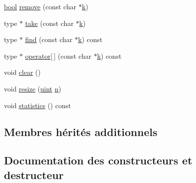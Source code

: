 \begin{DoxyCompactItemize}
\item 
\hyperlink{qglobal_8h_a1062901a7428fdd9c7f180f5e01ea056}{bool} \hyperlink{class_q_ascii_dict_aeb5f3b47e98054b30ccb2b29fac03b47}{remove} (const char $\ast$\hyperlink{060__command__switch_8tcl_a20363f854eb4098a446733d63d34dbc1}{k})
\item 
type $\ast$ \hyperlink{class_q_ascii_dict_a7a8d7b8be1c0c1212f15c287ec927be9}{take} (const char $\ast$\hyperlink{060__command__switch_8tcl_a20363f854eb4098a446733d63d34dbc1}{k})
\item 
type $\ast$ \hyperlink{class_q_ascii_dict_ab2b93f9e1033caf55d2ff5a4245f162e}{find} (const char $\ast$\hyperlink{060__command__switch_8tcl_a20363f854eb4098a446733d63d34dbc1}{k}) const 
\item 
type $\ast$ \hyperlink{class_q_ascii_dict_acf02bc233e712feda2121dc8fe9d0215}{operator\mbox{[}$\,$\mbox{]}} (const char $\ast$\hyperlink{060__command__switch_8tcl_a20363f854eb4098a446733d63d34dbc1}{k}) const 
\item 
void \hyperlink{class_q_ascii_dict_a544cec757a84773073971b0a9d3e5e55}{clear} ()
\item 
void \hyperlink{class_q_ascii_dict_aa783796d001af64fecedf110d8116d60}{resize} (\hyperlink{qglobal_8h_a4d3943ddea65db7163a58e6c7e8df95a}{uint} \hyperlink{060__command__switch_8tcl_acdde3cd86eb2421ce8dbb2e85227d368}{n})
\item 
void \hyperlink{class_q_ascii_dict_aad6958076e664a40fd67941c63a0f350}{statistics} () const 
\end{DoxyCompactItemize}
\subsection*{Membres hérités additionnels}


\subsection{Documentation des constructeurs et destructeur}
\hypertarget{class_q_ascii_dict_a45f3a7163f016feff94ec40fc2d16556}{}
